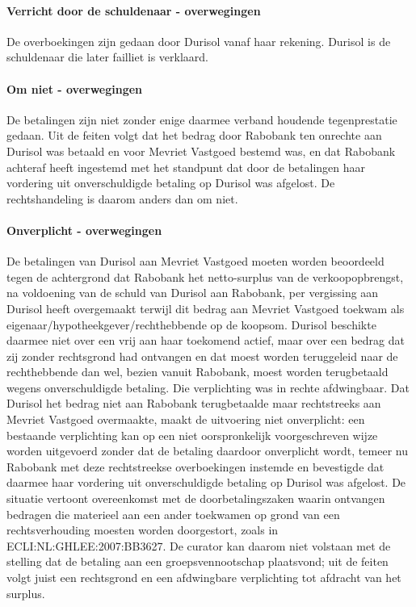 \documentclass[
  dutch,
  a4paper,
]{article}
\begin{document}
\paragraph{Verricht door de schuldenaar - overwegingen}\label{verricht-door-de-schuldenaar---overwegingen-13}

De overboekingen zijn gedaan door Durisol vanaf haar rekening. Durisol is de schuldenaar die later failliet is verklaard.

\paragraph{Om niet - overwegingen}\label{om-niet---overwegingen-13}

De betalingen zijn niet zonder enige daarmee verband houdende tegenprestatie gedaan. Uit de feiten volgt dat het bedrag door Rabobank ten onrechte aan Durisol was betaald en voor Mevriet Vastgoed bestemd was, en dat Rabobank achteraf heeft ingestemd met het standpunt dat door de betalingen haar vordering uit onverschuldigde betaling op Durisol was afgelost. De rechtshandeling is daarom anders dan om niet.

\paragraph{Onverplicht - overwegingen}\label{onverplicht---overwegingen-13}

De betalingen van Durisol aan Mevriet Vastgoed moeten worden beoordeeld tegen de achtergrond dat Rabobank het netto-surplus van de verkoopopbrengst, na voldoening van de schuld van Durisol aan Rabobank, per vergissing aan Durisol heeft overgemaakt terwijl dit bedrag aan Mevriet Vastgoed toekwam als eigenaar/hypotheekgever/rechthebbende op de koopsom. Durisol beschikte daarmee niet over een vrij aan haar toekomend actief, maar over een bedrag dat zij zonder rechtsgrond had ontvangen en dat moest worden teruggeleid naar de rechthebbende dan wel, bezien vanuit Rabobank, moest worden terugbetaald wegens onverschuldigde betaling. Die verplichting was in rechte afdwingbaar. Dat Durisol het bedrag niet aan Rabobank terugbetaalde maar rechtstreeks aan Mevriet Vastgoed overmaakte, maakt de uitvoering niet onverplicht: een bestaande verplichting kan op een niet oorspronkelijk voorgeschreven wijze worden uitgevoerd zonder dat de betaling daardoor onverplicht wordt, temeer nu Rabobank met deze rechtstreekse overboekingen instemde en bevestigde dat daarmee haar vordering uit onverschuldigde betaling op Durisol was afgelost. De situatie vertoont overeenkomst met de doorbetalingszaken waarin ontvangen bedragen die materieel aan een ander toekwamen op grond van een rechtsverhouding moesten worden doorgestort, zoals in ECLI:NL:GHLEE:2007:BB3627. De curator kan daarom niet volstaan met de stelling dat de betaling aan een groepsvennootschap plaatsvond; uit de feiten volgt juist een rechtsgrond en een afdwingbare verplichting tot afdracht van het surplus.
\end{document}
